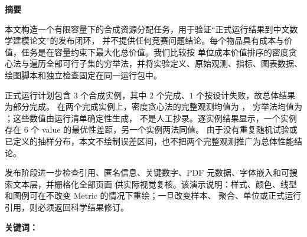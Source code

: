 \begin{center}
  {\bfseries \PaperTitle\par}
  \vspace{1.2em}
  {\bfseries 摘要\par}
\end{center}
\vspace{0.8em}

本文构造一个有限容量下的合成资源分配任务，用于验证“正式运行结果到中文数学建模论文”的发布闭环，
并不提供任何竞赛问题结论。每个物品具有成本与价值，任务是在容量约束下最大化总价值。我们比较按
单位成本价值排序的密度贪心法与遍历全部可行子集的穷举法，并将实验定义、原始观测、指标、图表数据、
绘图脚本和独立检查固定在同一运行包中。

正式运行计划包含 $3$ 个合成实例，其中 $2$ 个完成、$1$ 个按设计失败，故总体结果为部分完成。
在两个完成实例上，密度贪心法的完整观测均值为 \BaselineMeanValue{} \BaselineMeanValueUnit，
穷举法均值为 \AlternativeMeanValue{} \AlternativeMeanValueUnit；这些数值由运行清单确定性生成，
不是人工抄录。逐实例结果显示，一个实例存在 $6$ 个 value 的最优性差距，另一个实例两法同值。
由于没有重复随机试验或已定义的抽样分布，本文不绘制误差区间，也不把两个完整观测推广为总体性能结论。

发布阶段进一步检查引用、匿名信息、关键数字、PDF 元数据、字体嵌入和可搜索文本层，并栅格化全部页面
供实际视觉复核。该演示说明：样式、颜色、线型和图例可在不改变 Metric 的情况下重绘；一旦改变样本、
聚合、单位或正式运行引用，则必须返回科学结果修订。

\vfill
\noindent\textbf{关键词：}\PaperKeywords
